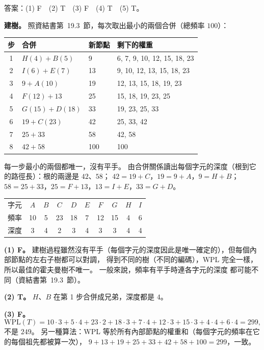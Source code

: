\begin{pastsoln}
答案：(1) F　(2) T　(3) F　(4) T　(5) T。

\textbf{建樹。} 照資結書第~19.3~節，每次取出最小的兩個合併（總頻率 $100$）：
\begin{center}
\small
\begin{tabular}{clll}
\toprule
步 & 合併 & 新節點 & 剩下的權重 \\
\midrule
1 & $H(4) + B(5)$ & 9 & 6, 7, 9, 10, 12, 15, 18, 23 \\
2 & $I(6) + E(7)$ & 13 & 9, 10, 12, 13, 15, 18, 23 \\
3 & $9 + A(10)$ & 19 & 12, 13, 15, 18, 19, 23 \\
4 & $F(12) + 13$ & 25 & 15, 18, 19, 23, 25 \\
5 & $G(15) + D(18)$ & 33 & 19, 23, 25, 33 \\
6 & $19 + C(23)$ & 42 & 25, 33, 42 \\
7 & $25 + 33$ & 58 & 42, 58 \\
8 & $42 + 58$ & 100 & 100 \\
\bottomrule
\end{tabular}
\end{center}
每一步最小的兩個都唯一，沒有平手。 由合併關係讀出每個字元的深度（根到它的路徑長）：根的兩邊是 $42$、$58$；
$42 = 19 + C$，$19 = 9 + A$，$9 = H + B$；$58 = 25 + 33$，$25 = F + 13$，$13 = I + E$，$33 = G + D$。
\begin{center}
\begin{tabular}{l*{9}{c}}
\toprule
字元 & $A$ & $B$ & $C$ & $D$ & $E$ & $F$ & $G$ & $H$ & $I$ \\
頻率 & 10 & 5 & 23 & 18 & 7 & 12 & 15 & 4 & 6 \\
深度 & 3 & 4 & 2 & 3 & 4 & 3 & 3 & 4 & 4 \\
\bottomrule
\end{tabular}
\end{center}

\textbf{(1) F。} 建樹過程雖然沒有平手（每個字元的深度因此是唯一確定的），但每個內部節點的左右子樹都可以對調，
得到不同的樹（不同的編碼），WPL 完全一樣，所以最佳的霍夫曼樹不唯一。 一般來說，頻率有平手時連各字元的深度
都可能不同（資結書第~19.3~節）。

\textbf{(2) T。} $H$、$B$ 在第 1 步合併成兄弟，深度都是 $4$。

\textbf{(3) F。}
\[
\mathrm{WPL}(T) = 10 \cdot 3 + 5 \cdot 4 + 23 \cdot 2 + 18 \cdot 3 + 7 \cdot 4 + 12 \cdot 3 + 15 \cdot 3 + 4 \cdot 4
+ 6 \cdot 4 = 299,
\]
不是 $249$。 另一種算法：WPL 等於所有內部節點的權重和（每個字元的頻率在它的每個祖先都被算一次），
$9 + 13 + 19 + 25 + 33 + 42 + 58 + 100 = 299$，一致。


\end{pastsoln}
